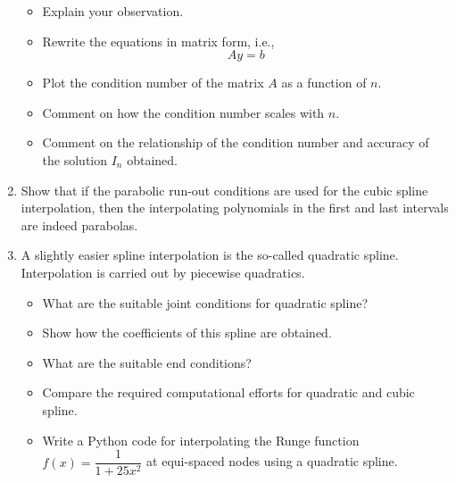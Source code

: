 \documentclass{article}
\begin{document}
\begin{enumerate}
\begin{itemize}
			\item
			Explain your observation.
			\item
			Rewrite the equations in matrix form, i.e.,
			$$Ay = b$$
			\item
			Plot the condition number of the matrix $A$ as a function of $n$.
			\item
			Comment on how the condition number scales with $n$.
			\item
			Comment on the relationship of the condition number and accuracy of the solution $I_n$ obtained.
		\end{itemize}
		\item
		Show that if the parabolic run-out conditions are used for the cubic spline interpolation, then the interpolating polynomials in the first and last intervals are indeed parabolas.
		\item
		A slightly easier spline interpolation is the so-called quadratic spline. Interpolation is carried out by piecewise quadratics.
		\begin{itemize}
			\item
			What are the suitable joint conditions for quadratic spline?
			\item
			Show how the coefficients of this spline are obtained.
			\item
			What are the suitable end conditions?
			\item
			Compare the required computational efforts for quadratic and cubic spline.
			\item
			Write a Python code for interpolating the Runge function $f(x) = \dfrac1{1+25x^2}$ at equi-spaced nodes using a quadratic spline.
		\end{itemize}
	\end{enumerate}
\end{document}
